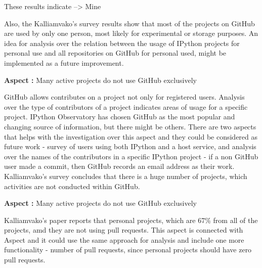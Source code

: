 These results indicate --> Mine

Also, the Kalliamvako's survey\cite{kalliamvakoupromises} results show that most of the projects on GitHub are used by only one person, most likely for experimental or storage purposes. An idea for analysis over the relation between the usage of IPython projects for personal use and all repositories on GitHub for personal used, might be implemented as a future improvement.


\vspace{5mm}
\begin{mdframed}
\vspace{1px}
\textbf{Aspect :}  Many active projects do not use GitHub exclusively
\vspace{1px}
\end{mdframed}
\vspace{2mm}

GitHub allows contributes on a project not only for registered users. Analysis over the type of contributors of a project indicates areas of usage for a specific project. IPython Observatory has chosen GitHub as the most popular and changing source of information, but there might be others. There are two aspects that helps with the investigation over this aspect and they could be considered as future work - survey of users using both IPython and a host service, and analysis over the names of the contributors in a specific IPython project - if a non GitHub user made a commit, then GitHub records an email address as their work\cite{kalliamvakoupromises}. Kalliamvako's survey\cite{kalliamvakoupromises} concludes that there is a huge number of projects, which activities are not conducted within GitHub.

\vspace{5mm}
\begin{mdframed}
\vspace{1px}
\textbf{Aspect :}  Many active projects do not use GitHub exclusively
\vspace{1px}
\end{mdframed}
\vspace{2mm}

Kalliamvako's paper\cite{kalliamvakoupromises} reports that personal projects, which are 67\% from all of the projects, amd they are not using pull requests. This aspect is connected with Aspect  and it could use the same approach for analysis and include one more functionality - number of pull requests, since personal projects should have zero pull requests.

